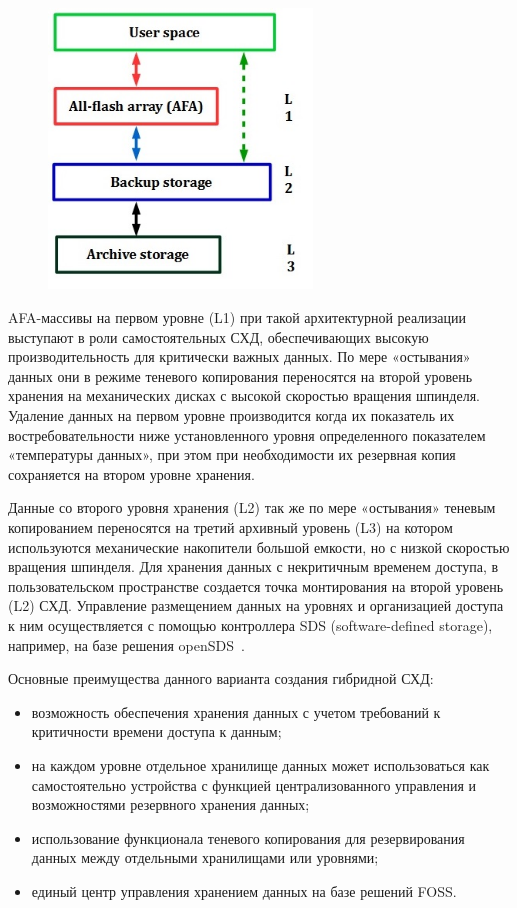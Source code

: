 \documentclass[10pt, a5paper]{article}
\begin{document}
\begin{center}
\begin{figure}[h!]
  \centering
  \includegraphics[width=7cm]{19_2018_Kliga1.jpg}
  \label{Kliga1}
\end{figure}
\end{center} 
 

AFA-массивы на первом уровне (L1) при такой архитектурной реализации выступают в роли самостоятельных СХД, обеспечивающих высокую производительность для критически важных данных. По мере «остывания» данных они в режиме теневого копирования переносятся на второй уровень хранения на механических дисках с высокой скоростью вращения шпинделя. Удаление данных на первом уровне производится когда их показатель их востребовательности ниже установленного уровня определенного показателем «температуры данных», при этом при необходимости их резервная копия сохраняется на втором уровне хранения.

Данные со второго уровня хранения (L2) так же по мере «остывания» теневым копированием переносятся на третий архивный уровень (L3) на котором используются механические накопители большой емкости, но с низкой скоростью вращения шпинделя. Для хранения данных с некритичным временем доступа, в пользовательском пространстве создается точка монтирования на второй уровень (L2) СХД. Управление размещением данных на уровнях и организацией доступа к ним осуществляется с помощью контроллера SDS (software-defined storage), например, на базе решения openSDS~\cite{Klyga-8}.

Основные преимущества данного варианта создания гибридной СХД:

\begin{itemize}
  \item возможность обеспечения хранения данных с учетом требований к критичности времени доступа к данным;
  \item на каждом уровне отдельное хранилище данных может использоваться как самостоятельно устройства с функцией централизованного управления и возможностями резервного хранения данных;
  \item использование функционала теневого копирования для резервирования данных между отдельными хранилищами или уровнями;
  \item единый центр управления хранением данных на базе решений FOSS.
\end{itemize}
\end{document}
